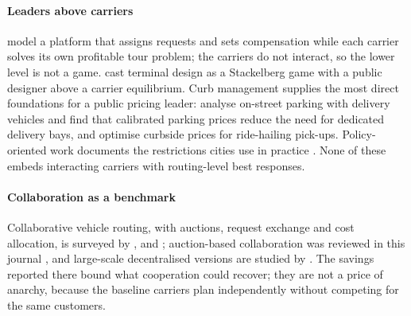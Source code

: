 \documentclass[preprint,12pt]{elsarticle}
\theoremstyle{definition}
\theoremstyle{remark}
\begin{document}
\paragraph{Leaders above carriers} \citet{Cerulli2024} model a platform that assigns requests and sets compensation while each carrier solves its own profitable tour problem; the carriers do not interact, so the lower level is not a game. \citet{Catalano2014} cast terminal design as a Stackelberg game with a public designer above a carrier equilibrium. Curb management supplies the most direct foundations for a public pricing leader: \citet{XuSun2024} analyse on-street parking with delivery vehicles and find that calibrated parking prices reduce the need for dedicated delivery bays, and \citet{LiuMaQian2023} optimise curbside prices for ride-hailing pick-ups. Policy-oriented work documents the restrictions cities use in practice \citep{Quak2009,HolguinVeras2016,Dey2019}. None of these embeds interacting carriers with routing-level best responses.

\paragraph{Collaboration as a benchmark} Collaborative vehicle routing, with auctions, request exchange and cost allocation, is surveyed by \citet{GanstererHartl2018}, \citet{Guajardo2016} and \citet{Cleophas2019}; auction-based collaboration was reviewed in this journal \citep{GanstererHartl2020omega}, and large-scale decentralised versions are studied by \citet{Los2020,Los2025}. The savings reported there bound what cooperation could recover; they are not a price of anarchy, because the baseline carriers plan independently without competing for the same customers.
\end{document}
